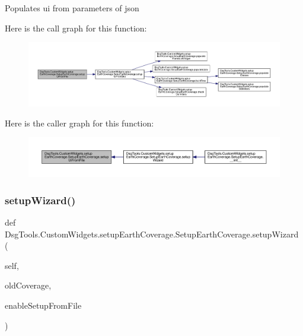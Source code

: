 \begin{DoxyVerb}Populates ui from parameters of json
\end{DoxyVerb}
 Here is the call graph for this function\+:
\nopagebreak
\begin{figure}[H]
\begin{center}
\leavevmode
\includegraphics[width=350pt]{class_dsg_tools_1_1_custom_widgets_1_1setup_earth_coverage_1_1_setup_earth_coverage_aa2bfcb725f3e9c36d4df890ae7656879_cgraph}
\end{center}
\end{figure}
Here is the caller graph for this function\+:
\nopagebreak
\begin{figure}[H]
\begin{center}
\leavevmode
\includegraphics[width=350pt]{class_dsg_tools_1_1_custom_widgets_1_1setup_earth_coverage_1_1_setup_earth_coverage_aa2bfcb725f3e9c36d4df890ae7656879_icgraph}
\end{center}
\end{figure}
\mbox{\label{class_dsg_tools_1_1_custom_widgets_1_1setup_earth_coverage_1_1_setup_earth_coverage_adec163acc8b4756dbc6b413989abb26b}} 
\subsubsection{\texorpdfstring{setup\+Wizard()}{setupWizard()}}
{\footnotesize\ttfamily def Dsg\+Tools.\+Custom\+Widgets.\+setup\+Earth\+Coverage.\+Setup\+Earth\+Coverage.\+setup\+Wizard (\begin{DoxyParamCaption}\item[{}]{self,  }\item[{}]{old\+Coverage,  }\item[{}]{enable\+Setup\+From\+File }\end{DoxyParamCaption})}

